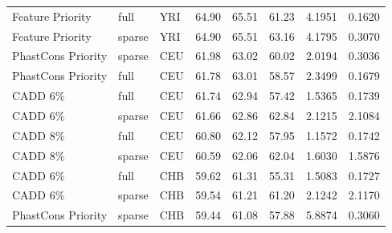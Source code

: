 \documentclass[11pt]{article}
\begin{document}
\begin{table}
\begin{tabular}{lll|crr|cc}
  Feature Priority &              full &          YRI &                        64.90 &             65.51 &            61.23 &                                 4.1951 &                                0.1620 \\
  Feature Priority &            sparse &          YRI &                        64.90 &             65.51 &            63.16 &                                 4.1795 &                                0.3070 \\
PhastCons Priority &            sparse &          CEU &                        61.98 &             63.02 &            60.02 &                                 2.0194 &                                0.3036 \\
PhastCons Priority &              full &          CEU &                        61.78 &             63.01 &            58.57 &                                 2.3499 &                                0.1679 \\
          CADD 6\% &              full &          CEU &                        61.74 &             62.94 &            57.42 &                                 1.5365 &                                0.1739 \\
          CADD 6\% &            sparse &          CEU &                        61.66 &             62.86 &            62.84 &                                 2.1215 &                                2.1084 \\
          CADD 8\% &              full &          CEU &                        60.80 &             62.12 &            57.95 &                                 1.1572 &                                0.1742 \\
          CADD 8\% &            sparse &          CEU &                        60.59 &             62.06 &            62.04 &                                 1.6030 &                                1.5876 \\
          CADD 6\% &              full &          CHB &                        59.62 &             61.31 &            55.31 &                                 1.5083 &                                0.1727 \\
          CADD 6\% &            sparse &          CHB &                        59.54 &             61.21 &            61.20 &                                 2.1242 &                                2.1170 \\
PhastCons Priority &            sparse &          CHB &                        59.44 &             61.08 &            57.88 &                                 5.8874 &                                0.3060 \\

\end{tabular}
\end{table}
\end{document}
